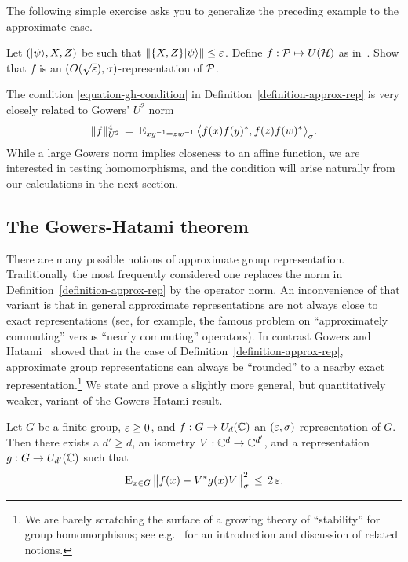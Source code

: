 The following simple exercise asks you to generalize the preceding example to the approximate case. 

\begin{exercise}
\label{exercise-wh-2}
Let $(|\psi\rangle,X,Z)$ be such that $\|\{X,Z\}|\psi\rangle\|\leq \varepsilon$. Define $f:\mathcal{P} \mapsto U(\mathcal{H})$ as in~. Show that $f$ is an $(O(\sqrt{\varepsilon}),\sigma)$-representation of $\mathcal{P}$. 
\end{exercise}

\begin{remark}
The condition \eqref{equation-gh-condition} in Definition~\ref{definition-approx-rep} is very closely related to Gowers' $U^2$ norm
$$\|f\|_{U^2}^4 \,=\, \textsc{E}_{xy^{-1}=zw^{-1}}\, \big\langle f(x)f(y)^* ,f(z)f(w)^* \big\rangle_\sigma.$$
While a large Gowers norm implies closeness to an affine function, we are interested in testing homomorphisms, and the condition  will arise naturally from our calculations in the next section. 
\end{remark}

\subsection{The Gowers-Hatami theorem}
\label{subsection-gowers-hatami-theorem}

There are many possible notions of approximate group representation. Traditionally the most frequently considered one replaces the norm in Definition~\ref{definition-approx-rep} by the operator norm. An inconvenience of that variant is that in general approximate representations are not always close to exact representations (see, for example, the famous problem on ``approximately commuting'' versus ``nearly commuting'' operators). In contrast 
Gowers and Hatami~\cite{gowers2017inverse} showed that in the case of Definition~\ref{definition-approx-rep}, approximate group representations can always be ``rounded'' to a nearby exact representation.\footnote{We are barely scratching the surface of a growing theory of ``stability'' for group homomorphisms; see e.g.~\cite{becker2020stability} for an introduction and discussion of related notions.} 
We state and prove a slightly more general, but quantitatively weaker, variant of the Gowers-Hatami result.

\begin{theorem}
\label{theorem-gh}
Let $G$ be a finite group, $\varepsilon\geq 0$, and $f:G\to U_d(\mathbb{C})$ an $(\varepsilon,\sigma)$-representation of $G$. Then there exists a $d'\geq d$, an isometry $V:\mathbb{C}^d\to \mathbb{C}^{d'}$, and a representation $g:G\to U_{d'}(\mathbb{C})$ such that 
$$\textsc{E}_{x\in G}\, \big\| f(x) - V^*g(x)V \big\|_\sigma^2\, \leq\, 2\,\varepsilon.$$ 
\end{theorem}

